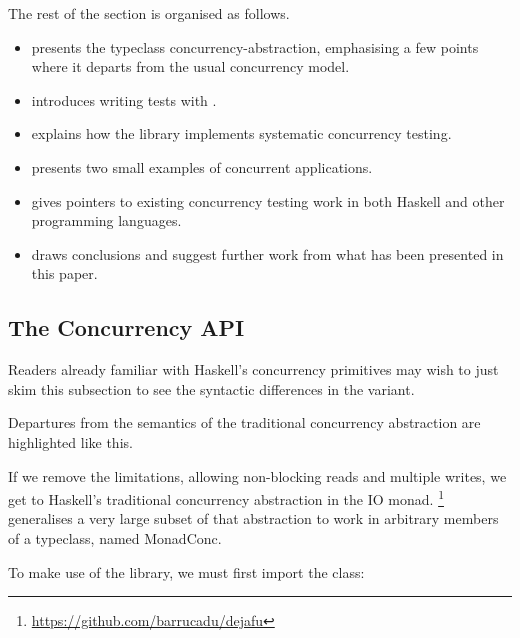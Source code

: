 The rest of the section is organised as follows.

\begin{itemize}
  \item {} presents the typeclass concurrency-abstraction,
    emphasising a few points where it departs from the usual
    concurrency model.

  \item {} introduces writing tests with \dejafu{}.

  \item {} explains how the library implements systematic
    concurrency testing.

  \item {} presents two small examples of concurrent
    applications.

  \item {} gives pointers to existing concurrency testing
    work in both Haskell and other programming languages.

  \item {} draws conclusions and suggest further work
    from what has been presented in this paper.
\end{itemize}

\subsection{The \dejafu{} Concurrency API}
\label{sec:prelims-dejafu-conc}

Readers already familiar with Haskell's concurrency primitives may
wish to just skim this subsection to see the syntactic differences in the
\dejafu{} variant.

\begin{departure}
  Departures from the semantics of the traditional concurrency
  abstraction are highlighted like this.
\end{departure}

If we remove the limitations, allowing non-blocking reads and multiple
writes, we get to Haskell's traditional concurrency abstraction in the
IO
monad. \dejafu{}\footnote{\url{https://github.com/barrucadu/dejafu}}
generalises a very large subset of that abstraction to work in
arbitrary members of a typeclass, named MonadConc.

To make use of the \dejafu{} library, we must first import the class:

